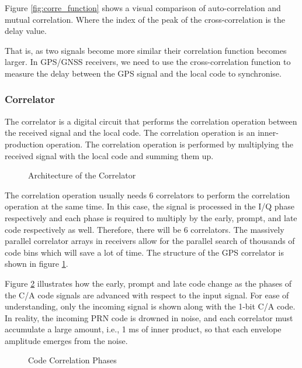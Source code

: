 Figure \ref{fig:corre_function} shows a visual comparison of auto-correlation and mutual correlation. Where the index of the peak of the cross-correlation is the delay value.

That is, as two signals become more similar their correlation function becomes larger. In GPS/GNSS receivers, we need to use the cross-correlation function to measure the delay between the GPS signal and the local code to synchronise.

\subsubsection{Correlator}
The correlator is a digital circuit that performs the correlation operation between the received signal and the local code. The correlation operation is an inner-production operation. The correlation operation is performed by multiplying the received signal with the local code and summing them up.

\begin{figure}[!htbp]
    \centering
    
    \caption{Architecture of the Correlator}
    \label{fig:correlator}
\end{figure}

The correlation operation usually needs 6 correlators to perform the correlation operation at the same time. In this case, the signal is processed in the I/Q phase respectively and each phase is required to multiply by the early, prompt, and late code respectively as well. Therefore, there will be 6 correlators. The massively parallel correlator arrays in receivers allow for the parallel search of thousands of code bins which will save a lot of time\cite{RN178}. The structure of the GPS correlator is shown in figure \ref{fig:correlator}.

Figure \ref{fig:code_delay} illustrates how the early, prompt and late code change as the phases of the C/A code signals are advanced with respect to the input signal. For ease of understanding, only the incoming signal is shown along with the 1-bit C/A code. In reality, the incoming PRN code is drowned in noise, and each correlator must accumulate a large amount, i.e., 1 ms of inner product, so that each envelope amplitude emerges from the noise.

\begin{figure}[!htbp]
    \centering
    
    \caption{Code Correlation Phases}
    \label{fig:code_delay}
\end{figure}

